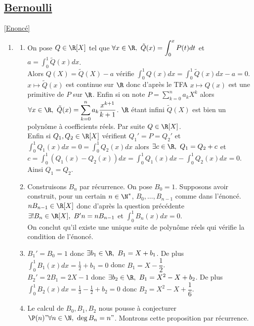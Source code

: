 \documentclass{book}
\begin{document}
	\subsection{\underline{Bernoulli} }
	\label{sec:Bernoulli}
	\textcolor{blue}{\hyperref[Bernoulli]{[Enoncé]}}\\
	\begin{enumerate}[leftmargin=*]
		\item
		\begin{enumerate}[label=\alph*.]
			\item On pose $Q\in \R[X]$ tel que $\forall x\in \R,\ \tilde Q(x)=\displaystyle\int_0^xP(t)dt$ et $a=\displaystyle\int_0^1\tilde Q(x)dx$.\\
			Alors $Q(X)=\tilde Q(X)-a$ vérifie $\displaystyle\int_0^1Q(x)dx=\int_0^1\tilde Q(x)dx-a=0$. $x\mapsto\tilde Q(x)$ est continue sur $\R$ donc d'après le TFA $x\mapsto Q(x)$ est une primitive de $P$ sur $\R$. Enfin si on note $P=\displaystyle\sum_{k=0}^na_kX^k$ alors $\forall x\in \R,\ \tilde Q(x)=\displaystyle\sum_{k=0}^na_k\frac{x^{k+1}}{k+1}$. $\R$ étant infini $\tilde Q(X)$ est bien un polynôme à coefficients réels. Par suite $Q\in \R[X]$.\\
			Enfin si $Q_1,Q_2\in \R[X]$ vérifient $Q_1'=P=Q_2'$ et $\displaystyle\int_0^1Q_1(x)dx=0=\int_0^1Q_2(x)dx$ alors $\exists c\in \R,\ Q_1=Q_2+c$ et $c=\displaystyle\int_0^1(Q_1(x)-Q_2(x))dx=\int_0^1Q_1(x)dx-\int_0^1Q_2(x)dx=0$.\\
			Ainsi $Q_1=Q_2$.
			\item Construisons $B_n$ par récurrence. On pose $B_0=1$. Supposons avoir construit, pour un certain $n\in \N^*$, $B_0,\dots,B_{n-1}$ comme dans l'énoncé. $nB_{n-1}\in \R[X]$ donc d'après la question précédente $\exists!B_n\in \R[X],\ B'n=nB_{n-1}$ et $\displaystyle\int_0^1B_n(x)dx=0$.\\
			On conclut qu'il existe une unique suite de polynôme réels qui vérifie la condition de l'énoncé.
			\item $B_1'=B_0=1$ donc $\exists b_1\in \R,\ B_1=X+b_1$. De plus $\displaystyle\int_0^1B_1(x)dx=\frac{1}{2}+b_1=0$ donc $B_1=X-\dfrac{1}{2}$.\\
			$B_2'=2B_1=2X-1$ donc $\exists b_2\in \R,\ B_1=X^2-X+b_2$. De plus $\displaystyle\int_0^1B_2(x)dx=\frac{1}{3}-\frac{1}{2}+b_2=0$ donc $B_2=X^2-X+\dfrac{1}{6}$.\\
			\item Le calcul de $B_0,B_1,B_2$ nous pousse à conjecturer $\P(n)"\forall n\in \N,\ \deg B_n=n"$. Montrons cette proposition par récurrence.\\

\end{enumerate}
\end{enumerate}
\end{document}
